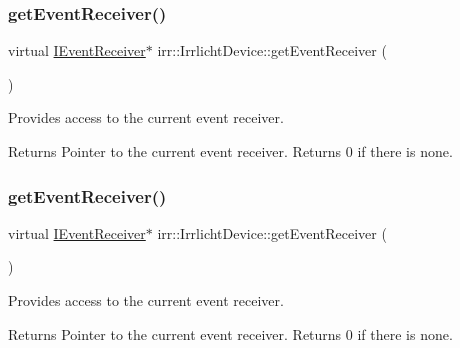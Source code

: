\subsubsection{\texorpdfstring{get\+Event\+Receiver()}{getEventReceiver()}\hspace{0.1cm}{\footnotesize\ttfamily [1/2]}}
{\footnotesize\ttfamily virtual \hyperlink{classirr_1_1IEventReceiver}{I\+Event\+Receiver}$\ast$ irr\+::\+Irrlicht\+Device\+::get\+Event\+Receiver (\begin{DoxyParamCaption}{ }\end{DoxyParamCaption})\hspace{0.3cm}{\ttfamily [pure virtual]}}



Provides access to the current event receiver. 

\begin{DoxyReturn}{Returns}
Pointer to the current event receiver. Returns 0 if there is none. 
\end{DoxyReturn}
\mbox{\label{classirr_1_1IrrlichtDevice_a26227e20e46915942d067532c61df42b}} 
\subsubsection{\texorpdfstring{get\+Event\+Receiver()}{getEventReceiver()}\hspace{0.1cm}{\footnotesize\ttfamily [2/2]}}
{\footnotesize\ttfamily virtual \hyperlink{classirr_1_1IEventReceiver}{I\+Event\+Receiver}$\ast$ irr\+::\+Irrlicht\+Device\+::get\+Event\+Receiver (\begin{DoxyParamCaption}{ }\end{DoxyParamCaption})\hspace{0.3cm}{\ttfamily [pure virtual]}}



Provides access to the current event receiver. 

\begin{DoxyReturn}{Returns}
Pointer to the current event receiver. Returns 0 if there is none. 
\end{DoxyReturn}
\mbox{\label{classirr_1_1IrrlichtDevice_a3d8d2dee2f57aa7e6c0d14592de3e6ed}} 
